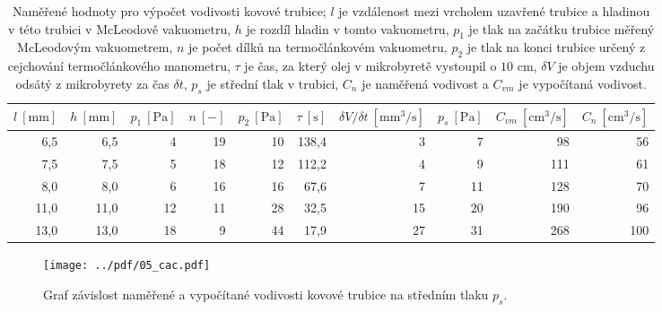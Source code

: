 \documentclass[english]{article}
\newcommand{\unit}[1]{\mathrm{#1}}
\begin{document}
\begin{table}[h!]
	\centering
	\begin{tabular}{|r|r|r|r|r|r|r|r|r|r|}
		\hline
		$l~\unit{[mm]}$ & $h~\unit{[mm]}$ & $p_1~\unit{[Pa]}$ & $n~\unit{[-]}$ & $p_2~\unit{[Pa]}$ & $\tau~\unit{[s]}$ & $\delta V /\delta t~\unit{[mm^3/s]}$ & $p_s~\unit{[Pa]}$ & $C_{vm}~\unit{[cm^3/s]}$ & $C_n~\unit{[cm^3/s]}$ \bigstrut\\
		\hline
		6,5   & 6,5   & 4     & 19    & 10    & 138,4 & 3     & 7     & 98    & 56 \bigstrut\\
		\hline
		7,5   & 7,5   & 5     & 18    & 12    & 112,2 & 4     & 9     & 111   & 61 \bigstrut\\
		\hline
		8,0   & 8,0   & 6     & 16    & 16    & 67,6  & 7     & 11    & 128   & 70 \bigstrut\\
		\hline
		11,0  & 11,0  & 12    & 11    & 28    & 32,5  & 15    & 20    & 190   & 96 \bigstrut\\
		\hline
		13,0  & 13,0  & 18    & 9     & 44    & 17,9  & 27    & 31    & 268   & 100 \bigstrut\\
		\hline
	\end{tabular}%
	
	
	\caption{Naměřené hodnoty pro výpočet vodivosti kovové trubice; $ l $ je vzdálenost mezi vrcholem uzavřené trubice a hladinou v této trubici v McLeodově vakuometru, $ h $ je rozdíl hladin v tomto vakuometru, $ p_1 $ je tlak na začátku trubice měřený McLeodovým vakuometrem, $n$ je počet dílků na termočlánkovém vakuometru,  $ p_2 $ je tlak na konci trubice určený z cejchování termočlánkového manometru, $\tau$ je čas, za který olej v  mikrobyretě vystoupil o $ 10 $ cm, $ \delta V $ je objem vzduchu odsátý z mikrobyrety za čas $ \delta t $, $p_{s}$ je střední tlak v trubici, $C_{n}$ je naměřená vodivost  a  $C_{vm}$ je vypočítaná vodivost.}
	\label{tab:vodivost2}
	
\end{table}

\begin{figure}[h!]
	\begin{center}
		\vspace*{-1cm}
		\texttt{[image: ../pdf/05\_cac.pdf]}
		\vspace*{-0,7cm}
		\caption{Graf závislost naměřené a vypočítané vodivosti kovové trubice na středním tlaku $ p_s $.}
		\label{graf_vodivost2}
	\end{center}
\end{figure}


%	
%	
\end{document}
